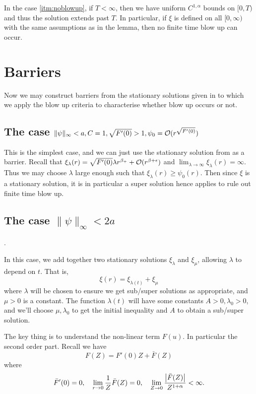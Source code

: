 \documentclass{amsart}
\begin{document}
\begin{rem}
In the case \ref{itm:noblowup}, if \(T < \infty\), then we have uniform \(C^{1,\alpha}\) bounds on \([0, T)\) and thus the solution extends past \(T\). In particular, if \(\xi\) is defined on all \([0, \infty)\) with the same assumptions as in the lemma, then no finite time blow up can occur.
\end{rem}

\section{Barriers}
\label{subsec:barriers}

Now we may construct barriers from the stationary solutions given in  to which we apply the blow up criteria  to characterise whether blow up occurs or not.

\subsection{The case \(\|\psi\|_{\infty} < a, C=1, \sqrt{F'(0)} > 1, \psi_0 = \operatorname{\mathcal{O}}(r^{\sqrt{F'(0)}})\)}

This is the simplest case, and we can just use the stationary solution from  as a barrier. Recall that \(\xi_{\lambda} (r) = \sqrt{F'(0)} \lambda r^{\beta_+} + \operatorname{\mathcal{O}}(r^{\beta + \epsilon})\) and \(\lim_{\lambda \to \infty} \xi_{\lambda} (r) = \infty\). Thus we may choose \(\lambda\) large enough such that \(\xi_{\lambda}(r) \geq \psi_0(r)\). Then since \(\xi\) is a stationary solution, it is in particular a super solution hence  applies to rule out finite time blow up. 

\subsection{The case \(\|\psi\|_{\infty} < 2a\)}.

In this case, we add together two stationary solutions \(\xi_{\lambda}\) and \(\xi_{\mu}\), allowing \(\lambda\) to depend on \(t\). That is,
\[
\xi(r) = \xi_{\lambda(t)} + \xi_{\mu}
\]
where \(\lambda\) will be chosen to ensure we get sub/super solutions as appropriate, and \(\mu > 0\) is a constant. The function \(\lambda(t)\) will have some constants \(A > 0, \lambda_0 > 0\), and we'll choose \(\mu, \lambda_0\) to get the initial inequality and \(A\) to obtain a sub/super solution.

The key thing is to understand the non-linear term \(F(u)\). In particular the second order part. Recall we have
\[
F(Z) = F'(0) Z + \bar{F}(Z)
\]
where
\[
\bar{F}'(0) = 0, \quad \lim_{r\to 0} \frac{1}{Z} \bar{F}(Z) = 0, \quad \lim_{Z\to 0} \frac{\left|{\bar{F}(Z)}\right|}{Z^{1+\alpha}} < \infty.
\]
\end{document}
